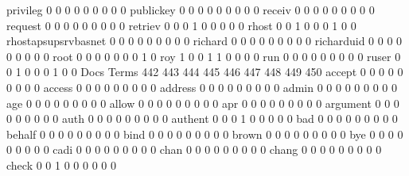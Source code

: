 \documentclass[compress,8pt]{beamer}
\begin{document}
\begin{frame}
\begin{Schunk}
  privileg                                   0   0   0   0   0   0   0   0   0
  publickey                                  0   0   0   0   0   0   0   0   0
  receiv                                     0   0   0   0   0   0   0   0   0
  request                                    0   0   0   0   0   0   0   0   0
  retriev                                    0   0   0   1   0   0   0   0   0
  rhost                                      0   0   1   0   0   0   1   0   0
  rhostapsupsrvbasnet                        0   0   0   0   0   0   0   0   0
  richard                                    0   0   0   0   0   0   0   0   0
  richarduid                                 0   0   0   0   0   0   0   0   0
  root                                       0   0   0   0   0   0   0   1   0
  roy                                        1   0   0   1   1   0   0   0   0
  run                                        0   0   0   0   0   0   0   0   0
  ruser                                      0   0   1   0   0   0   1   0   0
                                          Docs
Terms                                      442 443 444 445 446 447 448 449 450
  accept                                     0   0   0   0   0   0   0   0   0
  access                                     0   0   0   0   0   0   0   0   0
  address                                    0   0   0   0   0   0   0   0   0
  admin                                      0   0   0   0   0   0   0   0   0
  age                                        0   0   0   0   0   0   0   0   0
  allow                                      0   0   0   0   0   0   0   0   0
  apr                                        0   0   0   0   0   0   0   0   0
  argument                                   0   0   0   0   0   0   0   0   0
  auth                                       0   0   0   0   0   0   0   0   0
  authent                                    0   0   0   1   0   0   0   0   0
  bad                                        0   0   0   0   0   0   0   0   0
  behalf                                     0   0   0   0   0   0   0   0   0
  bind                                       0   0   0   0   0   0   0   0   0
  brown                                      0   0   0   0   0   0   0   0   0
  bye                                        0   0   0   0   0   0   0   0   0
  cadi                                       0   0   0   0   0   0   0   0   0
  chan                                       0   0   0   0   0   0   0   0   0
  chang                                      0   0   0   0   0   0   0   0   0
  check                                      0   0   1   0   0   0   0   0   0

\end{Schunk}
\end{frame}
\end{document}
